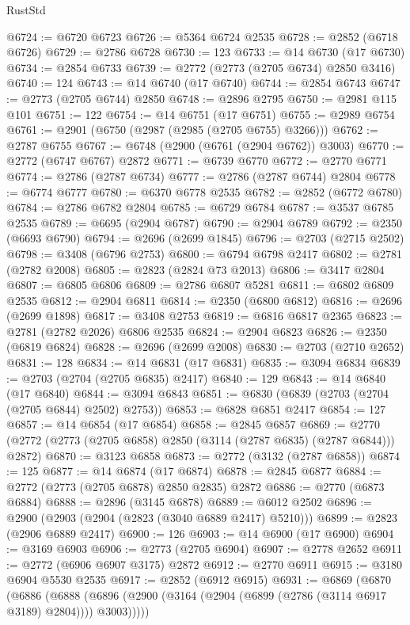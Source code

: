 \begin{lexlean}{RustStd}
\begin{coremodule}
@6724 := @6720 @6723
@6726 := @5364 @6724 @2535
@6728 := @2852 (@6718 @6726)
@6729 := @2786 @6728
@6730 := 123
@6733 := @14 @6730 (@17 @6730)
@6734 := @2854 @6733
@6739 := @2772 (@2773 (@2705 @6734) @2850 @3416)
@6740 := 124
@6743 := @14 @6740 (@17 @6740)
@6744 := @2854 @6743
@6747 := @2773 (@2705 @6744) @2850
@6748 := @2896 @2795
@6750 := @2981 @115 @101
@6751 := 122
@6754 := @14 @6751 (@17 @6751)
@6755 := @2989 @6754
@6761 := @2901 (@6750 (@2987 (@2985 (@2705 @6755) @3266)))
@6762 := @2787 @6755
@6767 := @6748 (@2900 (@6761 (@2904 @6762)) @3003)
@6770 := @2772 (@6747 @6767) @2872
@6771 := @6739 @6770
@6772 := @2770 @6771
@6774 := @2786 (@2787 @6734)
@6777 := @2786 (@2787 @6744) @2804
@6778 := @6774 @6777
@6780 := @6370 @6778 @2535
@6782 := @2852 (@6772 @6780)
@6784 := @2786 @6782 @2804
@6785 := @6729 @6784
@6787 := @3537 @6785 @2535
@6789 := @6695 (@2904 @6787)
@6790 := @2904 @6789
@6792 := @2350 (@6693 @6790)
@6794 := @2696 (@2699 @1845)
@6796 := @2703 (@2715 @2502)
@6798 := @3408 (@6796 @2753)
@6800 := @6794 @6798 @2417
@6802 := @2781 (@2782 @2008)
@6805 := @2823 (@2824 @73 @2013)
@6806 := @3417 @2804
@6807 := @6805 @6806
@6809 := @2786 @6807 @5281
@6811 := @6802 @6809 @2535
@6812 := @2904 @6811
@6814 := @2350 (@6800 @6812)
@6816 := @2696 (@2699 @1898)
@6817 := @3408 @2753
@6819 := @6816 @6817 @2365
@6823 := @2781 (@2782 @2026) @6806 @2535
@6824 := @2904 @6823
@6826 := @2350 (@6819 @6824)
@6828 := @2696 (@2699 @2008)
@6830 := @2703 (@2710 @2652)
@6831 := 128
@6834 := @14 @6831 (@17 @6831)
@6835 := @3094 @6834
@6839 := @2703 (@2704 (@2705 @6835) @2417)
@6840 := 129
@6843 := @14 @6840 (@17 @6840)
@6844 := @3094 @6843
@6851 := @6830 (@6839 (@2703 (@2704 (@2705 @6844) @2502) @2753))
@6853 := @6828 @6851 @2417
@6854 := 127
@6857 := @14 @6854 (@17 @6854)
@6858 := @2845 @6857
@6869 := @2770 (@2772 (@2773 (@2705 @6858) @2850 (@3114 (@2787 @6835) (@2787 @6844))) @2872)
@6870 := @3123 @6858
@6873 := @2772 (@3132 (@2787 @6858))
@6874 := 125
@6877 := @14 @6874 (@17 @6874)
@6878 := @2845 @6877
@6884 := @2772 (@2773 (@2705 @6878) @2850 @2835) @2872
@6886 := @2770 (@6873 @6884)
@6888 := @2896 (@3145 @6878)
@6889 := @6012 @2502
@6896 := @2900 (@2903 (@2904 (@2823 (@3040 @6889 @2417) @5210)))
@6899 := @2823 (@2906 @6889 @2417)
@6900 := 126
@6903 := @14 @6900 (@17 @6900)
@6904 := @3169 @6903
@6906 := @2773 (@2705 @6904)
@6907 := @2778 @2652
@6911 := @2772 (@6906 @6907 @3175) @2872
@6912 := @2770 @6911
@6915 := @3180 @6904 @5530 @2535
@6917 := @2852 (@6912 @6915)
@6931 := @6869
    (@6870
      (@6886
        (@6888 (@6896 (@2900 (@3164 (@2904 (@6899 (@2786 (@3114 @6917 @3189) @2804)))) @3003)))))

\end{coremodule}
\end{lexlean}
